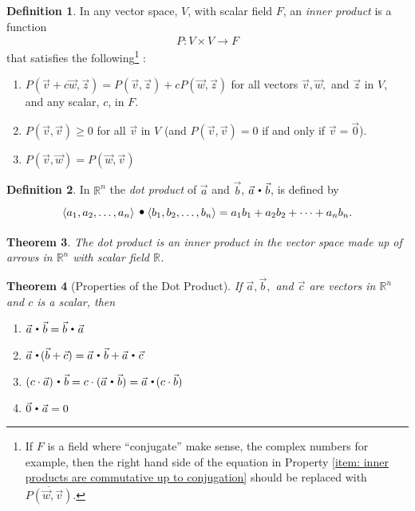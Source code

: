 \documentclass{article}[11pt]
\newtheorem{theorem}{Theorem}[section]
\theoremstyle{definition}
\newtheorem{definition}[theorem]{Definition}
\DeclareMathOperator*{\dotprod}{\scalerel*{\cdot}{\bigodot}}
\DeclarePairedDelimiter\vecvec{\langle}{\rangle}
\numberwithin{equation}{section}
\begin{document}
\noindent
\begin{minipage}{\textwidth}
	\begin{definition}
	In any vector space, \(V\), with scalar field \(F\), an \emph{inner product} is a function
	\begin{align*}
	P:V\times V\to F
	\end{align*}
	that satisfies the following\footnote{If \(F\) is a field where ``conjugate'' make sense, the complex numbers for example, then the right hand side of the equation in Property \ref{item: inner products are commutative up to conjugation} should be replaced with \( \overline{P(\vec{w},\vec{v})} \).} :
	\begin{enumerate}
		\item \(P(\vec{v}+c\vec{w},\vec{z})=P(\vec{v},\vec{z})+cP(\vec{w},\vec{z})\) for all vectors \( \vec{v}, \vec{w},\) and \(\vec{z}\) in \(V\), and any scalar, \(c\), in \(F\).
		\item \(P(\vec{v},\vec{v})\geq 0 \) for all \(\vec{v}\) in \(V\) (and \(P(\vec{v},\vec{v})= 0 \) if and only if \(\vec{v}=\vec{0}\)).
		\item\( P(\vec{v},\vec{w}) = P(\vec{w},\vec{v})\) \label{item: inner products are commutative up to conjugation}
	\end{enumerate}
	\end{definition}
\end{minipage}

\begin{definition}
	In \(\mathbb{R}^n\) the \emph{dot product} of \(\vec{a}\) and \(\vec{b}\), \(\vec{a}\dotprod\vec{b}\), is defined by
	\begin{align*}
		\vecvec{a_1,a_2,\dots,a_n}\dotprod\vecvec{b_1,b_2,\dots,b_n} = a_1b_1 + a_2b_2 +\dots + a_nb_n.
	\end{align*}
\end{definition}

\begin{theorem}
	The dot product is an inner product in the vector space made up of arrows in \(\mathbb{R}^n\) with scalar field \(\mathbb{R}\).
\end{theorem}

\begin{theorem}[Properties of the Dot Product]
	If \(\vec{a}, \vec{b},\) and \(\vec{c}\) are vectors in \( \mathbb{R}^n \) and \(c\) is a scalar, then
	\begin{multicols}{2}
		\begin{enumerate}
			\item \( \vec{a} \dotprod \vec{b} = \vec{b} \dotprod \vec{a} \)
			\item \( \vec{a} \dotprod (\vec{b}+\vec{c}) = \vec{a} \dotprod \vec{b}+\vec{a} \dotprod \vec{c} \)
			\item \( (c \cdot \vec{a})\dotprod \vec{b} = c \cdot (\vec{a}\dotprod \vec{b}) = \vec{a}\dotprod (c\cdot \vec{b}) \)
			\item \( \vec{0}\dotprod\vec{a} = 0 \)
		\end{enumerate}
	\end{multicols}
\end{theorem}
\end{document}
